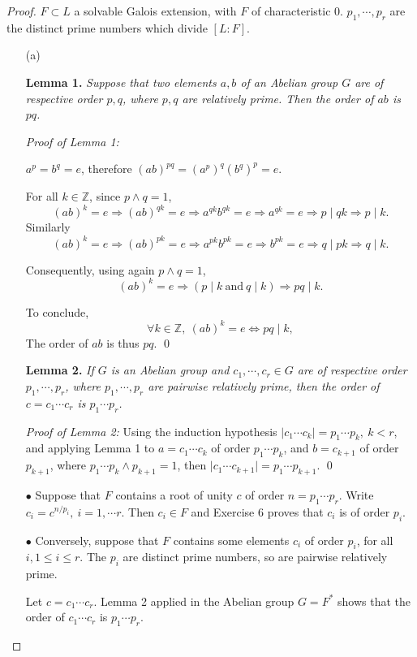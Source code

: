 \documentclass[11pt,a4paper]{article}
\newcommand{\Z}{\mathbb{Z}}
\begin{document}
\begin{proof}
$F\subset L $ a solvable Galois extension, with $F$ of characteristic 0. $p_1,\cdots,p_r$ are the distinct prime numbers which divide $[L:F]$.
\begin{enumerate}
\item[(a)]

{\bf Lemma 1.} {\it Suppose that two elements $a,b$ of an Abelian group $G$ are of respective order $p,q$, where $p,q$ are relatively prime. Then the order of $ab$ is $pq$. }

{\it Proof of Lemma 1:} 

$a^p= b^q=e$, therefore $(ab)^{pq} = (a^p)^q (b^q)^p = e$.

For all $k\in \Z$,  since $p \wedge q = 1$,
$$(ab)^k = e \Rightarrow (ab)^{qk} = e\Rightarrow a^{qk} b^{qk}=e \Rightarrow a^{qk} = e \Rightarrow p \mid qk \Rightarrow p \mid k.$$
Similarly
$$(ab)^k = e \Rightarrow (ab)^{pk} = e\Rightarrow a^{pk} b^{pk}=e \Rightarrow b^{pk} = e \Rightarrow q \mid pk \Rightarrow q \mid k.$$

Consequently, using again $p\wedge q = 1$, $$(ab)^k = e \Rightarrow (p \mid k \ \mathrm{and} \ q \mid k) \Rightarrow pq\mid  k.$$

To conclude, 
$$\forall k \in \Z,\ (ab)^k=e \iff pq \mid k,$$
The order of $ab$ is thus $pq$. \qed 

\bigskip 
{\bf Lemma 2.} {\it If $G$ is an Abelian group and $c_1, \cdots,c_r \in G$ are of respective order $p_1, \cdots, p_r$, where $p_1, \cdots,p_r$ are pairwise relatively prime, then the order of $c = c_1\cdots c_r$ is $p_1\cdots p_r$.}

{\it Proof of Lemma 2:}   Using the induction hypothesis $\vert c_1\cdots c_k \vert = p_1\cdots p_k, \ k<r$, and applying Lemma 1 to $a=c_1\cdots c_k$ of order  $p_1\cdots p_k$, and $b = c_{k+1}$ of order $p_{k+1}$, where $p_1\cdots p_k \wedge p_{k+1}=1$, then $\vert c_1\cdots c_{k+1} \vert  = p_1\cdots p_{k+1}$. \qed

$\bullet$ Suppose that $F$ contains a root of unity $c$ of order $n = p_1\cdots p_r$. Write $c_i = c^{n/p_i},\ i=1,\cdots r$. Then $c_i\in F$ and Exercise 6 proves that $c_i$ is of order $p_i$.

$\bullet$ Conversely, suppose that $F$ contains some elements $c_i$ of order $p_i$, for all $i, 1\leq i \leq r$. The $p_i$ are distinct prime numbers, so are pairwise relatively prime.

Let $c = c_1\cdots c_r$. Lemma 2 applied in the Abelian group $G = F^*$ shows that the order of $c_1\cdots c_r$ is $p_1\cdots p_r$.


\end{enumerate}
\end{proof}
\end{document}
